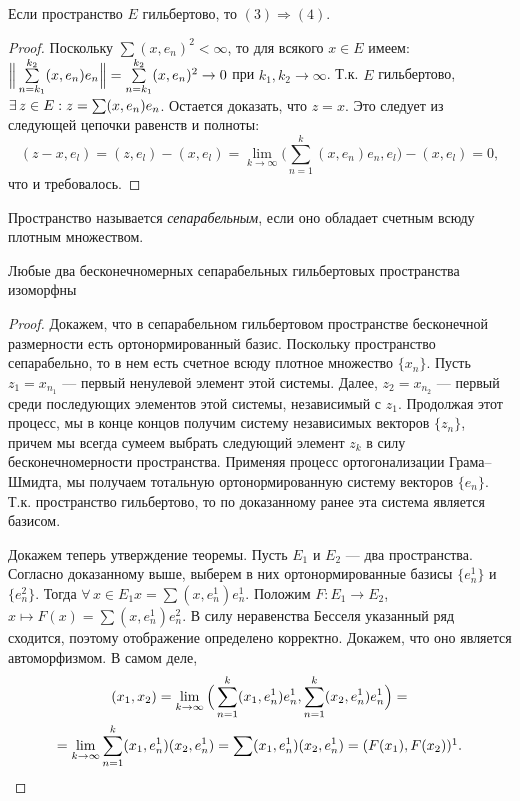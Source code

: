 \documentclass[12pt,titlepage, a4paper]{article}
\begin{document}
\begin{theorem}
Если пространство $E$ гильбертово, то $(3)\Rightarrow(4)$.
\end{theorem}

\begin{proof}
Поскольку $\sum(x,e_n)^2<\infty$, то для всякого $x\in E$ имеем:
$\Big\|\sum\limits_{n=k_1}^{k_2}(x,e_n)e_n\Big\|\p=\sum\limits_{n=k_1}^{k_2}
(x,e_n)^2\to 0$ при $k_1,k_2\to\infty$. Т.к. $E$ гильбертово,
$\exists\,z\in E:z\p=\sum(x,e_n)e_n$. Остается доказать, что $z=x$.
Это следует из следующей цепочки равенств и полноты:
$$(z-x,e_l)=(z,e_l)-(x,e_l)=\lim\limits_{k\to\infty}\Big(\sum\limits_{n=1}^k
(x,e_n)e_n, e_l\Big)-(x,e_l)=0,$$ что и требовалось.
\end{proof}

\begin{defen}
Пространство называется \emph{сепарабельным}, если оно обладает
счетным всюду плотным множеством.
\end{defen}

\begin{theorem}
Любые два бесконечномерных сепарабельных гильбертовых пространства
изоморфны
\end{theorem}

\begin{proof}
Докажем, что в сепарабельном гильбертовом простра\-нстве бесконечной
размерности есть ортонормированный базис. Поскольку пространство
сепарабельно, то в нем есть счетное всюду плотное множество
$\{x_n\}$. Пусть $z_1=x_{n_1}$ --- первый ненулевой элемент этой
системы. Далее, $z_2=x_{n_2}$ --- первый среди последующих элементов
этой системы, независимый с $z_1$. Продолжая этот процесс, мы в
конце концов получим систему независимых векторов $\{z_n\}$, причем
мы всегда сумеем выбрать следующий элемент $z_k$ в силу
бесконечномерности пространства. Применяя процесс ортогонализации
Грама--Шмидта, мы получаем тотальную ортонормированную систему
векторов $\{e_n\}$. Т.к. пространство гильбертово, то по доказанному
ранее эта система является базисом.

Докажем теперь утверждение теоремы. Пусть $E_1$ и $E_2$ --- два
пространства. Согласно доказанному выше, выберем в них
ортонормированные базисы $\{e_n^1\}$ и $\{e_n^2\}$. Тогда
$\forall\,x\in E_1$\;\;$x=\sum(x,e_n^1)e_n^1$. Положим $F\colon
E_1\to E_2$, $x\mapsto F(x)=\sum(x,e_n^1)e_n^2$. В силу неравенства
Бесселя указанный ряд сходится, поэтому отображение определено
корректно. Докажем, что оно является автоморфизмом. В самом деле,
\begin{multline*}
(x_1,x_2)=\lim\limits_{k\to\infty}\Big(\sum\limits_{n=1}^k(x_1,e_n^1)e_n^1,
\sum\limits_{n=1}^k(x_2,e_n^1)e_n^1\Big)=\\
=\lim\limits_{k\to\infty} \sum\limits_{n=1}^k(x_1,e_n^1)(x_2,e_n^1)=
\sum\limits(x_1,e_n^1)(x_2,e_n^1)=(F(x_1),F(x_2))\footnotemark.
\end{multline*}
\end{proof}
\end{document}
